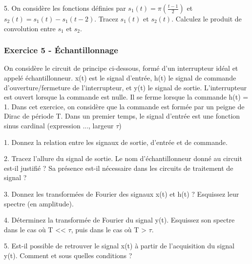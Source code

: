 	5. On considère les fonctions définies par $s_{1}(t)=\pi(\frac{t-1}{2})$ et $s_{2}(t)=s_{1}(t)-s_{1}(t-2)$. Tracez $s_{1}(t)$ et $s_{2}(t)$. Calculez le produit de convolution entre $s_{1}$ et $s_{2}$.
	
	\vspace{1\baselineskip}
	
	\subsubsection{Exercice 5 - Échantillonnage}
	
	On considère le circuit de principe ci-dessous, formé d'un interrupteur idéal et appelé échantillonneur. x(t) est le signal d'entrée, h(t) le signal de commande d'ouverture/fermeture de l'interrupteur, et y(t) le signal de sortie. L'interrupteur est ouvert lorsque la commande est nulle. Il se ferme lorsque la commande h(t) = 1.
	Dans cet exercice, on considère que la commande est formée par un peigne de Dirac de période T. Dans un premier temps, le signal d'entrée est une fonction sinus cardinal (expression ..., largeur $\tau$)
	
	1. Donnez la relation entre les signaux de sortie, d'entrée et de commande.
	
	2. Tracez l'allure du signal de sortie. Le nom d'échantillonneur donné au circuit est-il justifié ? Sa présence est-il nécessaire dans les circuits de traitement de signal ?
	
	3. Donnez les transformées de Fourier des signaux x(t) et h(t) ? Esquissez leur spectre (en amplitude).
	
	4. Déterminez la transformée de Fourier du signal y(t). Esquissez son spectre dans le cas où T << $\tau$, puis dans le cas où T > $\tau$.
	
	5. Est-il possible de retrouver le signal x(t) à partir de l'acquisition du signal y(t). Comment et sous quelles conditions ?
	
	
	
	
	